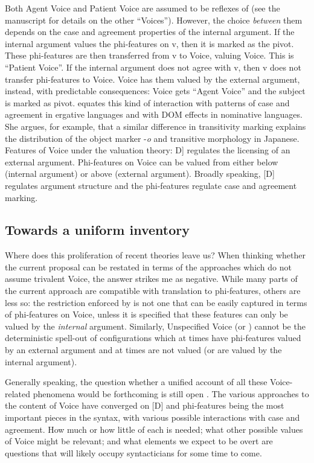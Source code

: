 Both Agent Voice and Patient Voice are assumed to be reflexes of {\vd} (see the manuscript for details on the other ``Voices''). However, the choice \emph{between} them depends on the case and agreement properties of the internal argument. If the internal argument values the phi-features on v, then it is marked as the pivot. These phi-features are then transferred from v to Voice, valuing Voice. This is ``Patient Voice''. If the internal argument does not agree with v, then v does not transfer phi-features to Voice. Voice has them valued by the external argument, instead, with predictable consequences: Voice gets ``Agent Voice'' and the subject is marked as pivot. \cite{nie17} equates this kind of interaction with patterns of case and agreement in ergative languages and with DOM effects in nominative languages. She argues, for example, that a similar difference in transitivity marking explains the distribution of the object marker -\emph{o} and transitive morphology in Japanese.
\pex Features of Voice under the valuation theory:
	\a {[}D] regulates the licensing of an external argument.
	\a Phi-features on Voice can be valued from either below (internal argument) or above (external argument).
\xe
Broadly speaking, [D] regulates argument structure and the phi-features regulate case and agreement marking.


	\subsection{Towards a uniform inventory}
Where does this proliferation of recent theories leave us? When thinking whether the current proposal can be restated in terms of the approaches which do not assume trivalent Voice, the answer strikes me as negative. While many parts of the current approach are compatible with translation to phi-features, others are less so: the restriction enforced by {\vz} is not one that can be easily captured in terms of phi-features on Voice, unless it is specified that these features can only be valued by the \emph{internal} argument. Similarly, Unspecified Voice (or {\tkal}) cannot be the deterministic spell-out of configurations which at times have phi-features valued by an external argument and at times are not valued (or are valued by the internal argument).

Generally speaking, the question whether a unified account of all these Voice-related phenomena would be forthcoming is still open \citep[191ff12]{wurmbrandshimamura17}. The various approaches to the content of Voice have converged on [D] and phi-features being the most important pieces in the syntax, with various possible interactions with case and agreement. How much or how little of each is needed; what other possible values of Voice might be relevant; and what elements we expect to be overt are questions that will likely occupy syntacticians for some time to come.

